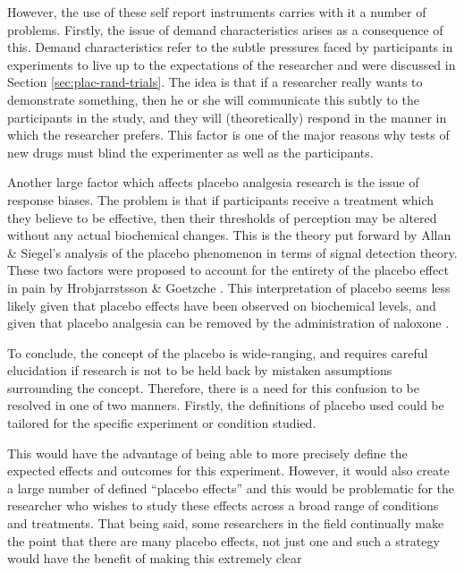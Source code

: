 However, the use of these self report instruments carries with it a number of problems. Firstly, the issue of demand characteristics arises as a consequence of this. Demand characteristics refer to the subtle pressures faced by participants in experiments to live up to the expectations of the researcher \cite{weber1972subject} and were discussed in Section \ref{sec:plac-rand-trials}. The idea is that if a researcher really wants to demonstrate something, then he or she will communicate this subtly to the participants in the study, and they will (theoretically) respond in the manner in which the researcher prefers. This factor is one of the major reasons why tests of new drugs must blind the experimenter as well as the participants. 

Another large factor which affects placebo analgesia research is the issue of response biases. The problem is that if participants receive a treatment which they believe to be effective, then their thresholds of perception may be altered without any actual biochemical changes. This is the theory put forward by Allan \& Siegel's \cite{Allan2002} analysis of the placebo phenomenon in terms of signal detection theory. These two factors were proposed to account for the entirety of the placebo effect in pain by Hrobjarrstsson \& Goetzche \cite{Hrobjartsson2001}. This interpretation of placebo seems less likely given that placebo effects have been observed on biochemical levels, and given that placebo analgesia can be removed by the administration of naloxone \cite{Levine1979,Benedetti2003}. 



To conclude, the concept of the placebo is wide-ranging, and requires careful elucidation if research is not to be held back by mistaken assumptions surrounding the concept. Therefore, there is a need for this confusion to be resolved in one of two manners. Firstly, the definitions of placebo used could be tailored for the specific experiment or condition studied. 

This would have the advantage of being able to more precisely define the expected effects and outcomes for this experiment. However, it would also create a large number of defined ``placebo effects'' and this would be problematic for the researcher who wishes to study these effects across a broad range of conditions and treatments. That being said, some researchers in the field continually make the point that there are many placebo effects, not just one and such a strategy would have the benefit of making this extremely clear \cite{Benedetti2008} 

